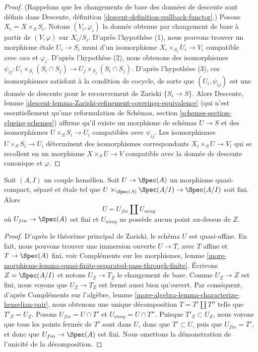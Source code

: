 \begin{proof}
(Rappelons que les changements de base des données de descente sont définis dans
Descente, définition \ref{descent-definition-pullback-functor}.)
Posons $X_i = X \times_S S_i$. Notons $(V_i, \varphi_i)$ la donnée obtenue
par changement de base à partir de $(V, \varphi)$ sur $X_i/S_i$.
D'après l'hypothèse (1), nous pouvons trouver un morphisme \'etale $U_i \to S_i$
muni d'un isomorphisme $X_i \times_{S_i} U_i \to V_i$ compatible avec
$can$ et $\varphi_i$. D'après l'hypothèse (2), nous obtenons des isomorphismes
$\psi_{ij} : U_i \times_{S_i} (S_i \cap S_j) \to
U_j \times_{S_j} (S_i \cap S_j)$.
D'après l'hypothèse (3), ces isomorphismes satisfont à la condition de cocycle,
de sorte que $(U_i, \psi_{ij})$ est une donnée de descente pour le
recouvrement de Zariski $\{S_i \to S\}$. Alors Descente, lemme
\ref{descent-lemma-Zariski-refinement-coverings-equivalence}
(qui n'est essentiellement qu'une reformulation de
Schémas, section \ref{schemes-section-glueing-schemes})
affirme qu'il existe un morphisme de schémas $U \to S$
et des isomorphismes $U \times_S S_i \to U_i$ compatibles
avec $\psi_{ij}$. Les isomorphismes $U \times_S S_i \to U_i$
déterminent des isomorphismes correspondants $X_i \times_S U \to V_i$
qui se recollent en un morphisme $X \times_S U \to V$ compatible
avec la donnée de descente canonique et $\varphi$.
\end{proof}

\begin{lemma}
\label{lemma-split-henselian}
Soit $(A, I)$ un couple hensélien. Soit $U \to \Spec(A)$ un morphisme
quasi-compact, séparé et \'etale tel que
$U \times_{\Spec(A)} \Spec(A/I) \to \Spec(A/I)$ soit fini.
Alors
$$
U = U_{fin} \amalg U_{away}
$$
où $U_{fin} \to \Spec(A)$ est fini et $U_{away}$ ne possède
aucun point au-dessus de $Z$.
\end{lemma}

\begin{proof}
D'après le théorème principal de Zariski, le schéma $U$ est quasi-affine.
En fait, nous pouvons trouver une immersion ouverte $U \to T$, avec $T$ affine et
$T \to \Spec(A)$ fini, voir Compléments sur les morphismes, lemme
\ref{more-morphisms-lemma-quasi-finite-separated-pass-through-finite}.
Écrivons $Z = \Spec(A/I)$ et notons $U_Z \to T_Z$ le changement de base.
Comme $U_Z \to Z$ est fini, nous voyons que $U_Z \to T_Z$ est fermé
aussi bien qu'ouvert. Par conséquent, d'après
Compléments sur l'algèbre, lemme \ref{more-algebra-lemma-characterize-henselian-pair},
nous obtenons une unique décomposition $T = T' \amalg T''$ telle que $T'_Z = U_Z$.
Posons $U_{fin} = U \cap T'$ et $U_{away} = U \cap T''$. Puisque
$T'_Z \subset U_Z$, nous voyons que tous les points fermés de $T'$ sont dans $U$,
donc que $T' \subset U$, puis que $U_{fin} = T'$, et donc que $U_{fin} \to \Spec(A)$
est fini. Nous omettons la démonstration
de l'unicité de la décomposition.
\end{proof}


